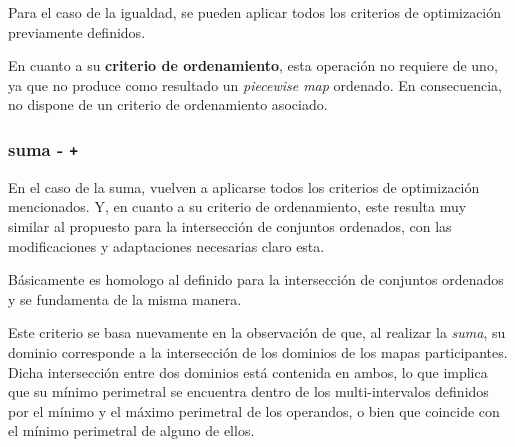 Para el caso de la igualdad, se pueden aplicar todos los criterios de optimización previamente definidos. 

En cuanto a su \textbf{criterio de ordenamiento}, esta operación no requiere de uno, ya que no produce como resultado un \textit{piecewise map} ordenado. En consecuencia, no dispone de un criterio de ordenamiento asociado.

\subsubsection{suma - \texttt{+}}

En el caso de la suma, vuelven a aplicarse todos los criterios de optimización mencionados. Y, en cuanto a su criterio de ordenamiento, este resulta muy similar al propuesto para la intersección de conjuntos ordenados, con las modificaciones y adaptaciones necesarias claro esta.


\begin{center}
\end{center}


Básicamente es homologo al definido para la intersección de conjuntos ordenados y se fundamenta de la misma manera.

Este criterio se basa nuevamente en la observación de que, al realizar la \textit{suma}, 
su dominio corresponde a la intersección de los dominios de los mapas participantes. 
Dicha intersección entre dos dominios está contenida en ambos, lo que implica que su mínimo perimetral 
se encuentra dentro de los multi-intervalos definidos por el mínimo y el máximo perimetral de los operandos, 
o bien que coincide con el mínimo perimetral de alguno de ellos.  


